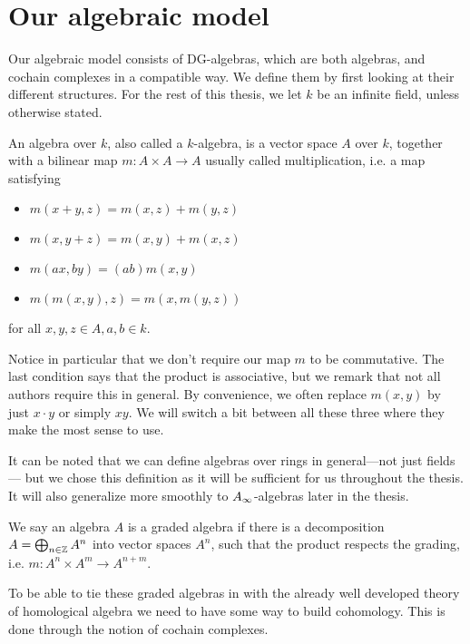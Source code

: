 \section{Our algebraic model}

Our algebraic model consists of DG-algebras, which are both algebras, and cochain complexes in a compatible way. We define them by first looking at their different structures. For the rest of this thesis, we let $k$ be an infinite field, unless otherwise stated.  

\begin{definition}[Algebra]
An algebra over $k$, also called a $k$-algebra, is a vector space $A$ over $k$, together with a bilinear map $m: A\times A\rightarrow A$ usually called multiplication, i.e. a map satisfying 
\begin{itemize}
    \item $m(x+y, z) = m(x, z) + m(y, z)$
    \item $m(x, y+z) = m(x, y) + m(x, z)$
    \item $m(ax, by) = (ab)m(x, y)$
    \item $m(m(x, y), z) = m(x, m(y, z))$
\end{itemize}
for all $x, y , z \in A, a, b\in k$. 
\end{definition}

Notice in particular that we don't require our map $m$ to be commutative. The last condition says that the product is associative, but we remark that not all authors require this in general. By convenience, we often replace $m(x, y)$ by just $x\cdot y$ or simply $xy$. We will switch a bit between all these three where they make the most sense to use. 

It can be noted that we can define algebras over rings in general---not just fields--- but we chose this definition as it will be sufficient for us throughout the thesis. It will also generalize more smoothly to $A_{\infty}$-algebras later in the thesis. 

\begin{definition}
We say an algebra $A$ is a graded algebra if there is a decomposition $A = \bigoplus_{n\in \mathbb{Z}}A^n$ into vector spaces $A^n$, such that the product respects the grading, i.e. $m:A^n\times A^m \rightarrow A^{n+m}$. 
\end{definition}

To be able to tie these graded algebras in with the already well developed theory of homological algebra we need to have some way to build cohomology. This is done through the notion of cochain complexes. 

